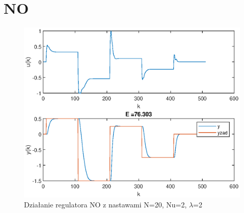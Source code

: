 		
	\section{NO}
		\label{sec:NO}
		
		\begin{figure}[h!]
			\centering
			\includegraphics[width=\linewidth]{img/NO.eps}
			\caption{Działanie regulatora NO z nastawami N=20, Nu=2, $\lambda$=2}
			\label{fig:NO}
		\end{figure}